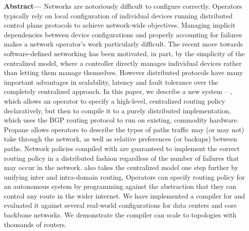 \textbf{Abstract---}
Networks are notoriously difficult to configure correctly. 
Operators typically rely on local configuration of individual devices running 
distributed control plane protocols to achieve network-wide objectives. 
Managing implicit dependencies between device configurations and properly accounting for failures makes 
a network operator's work particularly difficult. 
%
The recent move towards software-defined networking has been motivated, in part, 
by the simplicity of the centralized model, where a controller directly manages 
individual devices rather than letting them manage themselves. However distributed 
protocols have many important advantages in scalability,
latency and fault tolerance over the completely centralized approach.
%
In this paper, we describe a new system -- \sysname, which allows an operator to specify a high-level, 
centralized routing policy declaratively, but then to compile it to a purely distributed 
implementation, which uses the BGP routing protocol to run on existing, commodity hardware. 
%
Propane allows operators to describe the types of paths traffic may (or may not) take 
through the network, as well as relative preferences (or backups) between paths. 
%
Network policies compiled with \sysname are guaranteed to implement the correct routing policy 
in a distributed fashion regardless of the number of failures that may occur in the network. 
%
\sysname also takes the centralized model one step further by unifying inter and intra-domain routing. Operators can specify routing policy for an autonomous system by programming against the abstraction that they can control any route in the wider internet.
%
We have implemented a compiler for \sysname and evaluated it against several real-world configurations for data centers and core backbone networks. We demonstrate the \sysname compiler can scale to 
topologies with thousands of routers.

